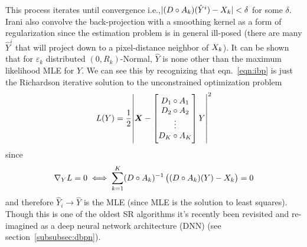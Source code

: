 %
This process iterates until convergence i.e.,\(\lvert (D \circ A_k)(\hat{Y}^i) - X_k \rvert < \delta\) for some \(\delta\).
%
Irani \etal\cite{Irani1991ImprovingRB} also convolve the back-projection with a smoothing kernel as a form of regularization since the estimation problem is in general ill-posed (there are many \(\hat{Y}^{i}\) that will project down to a pixel-distance neighbor of \(X_k\)).
%
It can be shown\cite{Elad1996} that for \(\varepsilon_k\) distributed \((0, R_k)\)-Normal, \(\hat{Y}\) is none other than the maximum likelihood MLE for \(Y\).
%
We can see this by recognizing that eqn.~\eqref{eqn:ibp} is just the Richardson iterative\cite{Anderssen:1972:RNM:891962} solution to the unconstrained optimization problem
\begin{equation}
    L(Y) = \frac{1}{2} \abs{ \bm{X} -  \begin{bmatrix}
            D_1 \circ A_1 \\
            D_2 \circ A_2 \\
            \vdots        \\
            D_K \circ A_K \\
        \end{bmatrix}  Y  }^2
    \label{eqn:l2regression}
\end{equation}
since
\begin{equation*}
    \nabla_{Y} L = 0
    \iff
    \sum_{k=1}^K (D \circ A_k)^{-1}\left( (D \circ A_k)(Y) - X_k \right) = 0
\end{equation*}
and therefore \(\hat{Y}_i \rightarrow \hat{Y}\) is the MLE (since MLE is the solution to least squares\cite{CaseBerg:01}).
%
Though this is one of the oldest SR algorithms it's recently been revisited and re-imagined as a deep neural network architecture (DNN)\cite{haris2018deep} (see section~\ref{subsubsec:dbpn}).
